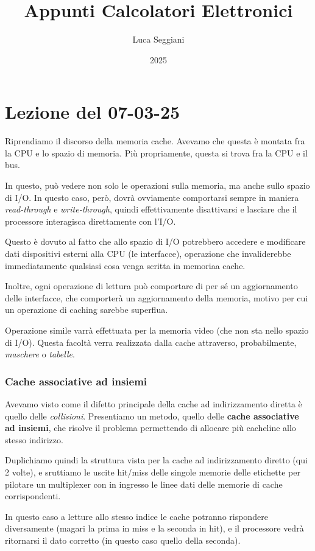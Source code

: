 \documentclass[a4paper,11pt]{article}
\title{Appunti Calcolatori Elettronici}
\author{Luca Seggiani}
\date{2025}
\begin{document}
\section{Lezione del 07-03-25}

\thispagestyle{empty}
\pagestyle{fancy}

Riprendiamo il discorso della memoria cache.
Avevamo che questa è montata fra la CPU e lo spazio di memoria.
Più propriamente, questa si trova fra la CPU e il bus.

In questo, può vedere non solo le operazioni sulla memoria, ma anche sullo spazio di I/O.
In questo caso, però, dovrà ovviamente comportarsi sempre in maniera \textit{read-through} e \textit{write-through}, quindi effettivamente disattivarsi e lasciare che il processore interagisca direttamente con l'I/O.

Questo è dovuto al fatto che allo spazio di I/O potrebbero accedere e modificare dati dispositivi esterni alla CPU (le interfacce), operazione che invaliderebbe immediatamente qualsiasi cosa venga scritta in memoriaa cache.

Inoltre, ogni operazione di lettura può comportare di per sé un aggiornamento delle interfacce, che comporterà un aggiornamento della memoria, motivo per cui un operazione di caching sarebbe superflua.

Operazione simile varrà effettuata per la memoria video (che non sta nello spazio di I/O).
Questa facoltà verra realizzata dalla cache attraverso, probabilmente, \textit{maschere} o \textit{tabelle}.

\subsubsection{Cache associative ad insiemi}
Avevamo visto come il difetto principale della cache ad indirizzamento diretta è quello delle \textit{collisioni}.
Presentiamo un metodo, quello delle \textbf{cache associative ad insiemi}, che risolve il problema permettendo di allocare più cacheline allo stesso indirizzo.

Duplichiamo quindi la struttura vista per la cache ad indirizzamento diretto (qui 2 volte), e sruttiamo le uscite hit/miss delle singole memorie delle etichette per pilotare un multiplexer con in ingresso le linee dati delle memorie di cache corrispondenti.

In questo caso a letture allo stesso indice le cache potranno rispondere diversamente (magari la prima in miss e la seconda in hit), e il processore vedrà ritornarsi il dato corretto (in questo caso quello della seconda).
\end{document}
